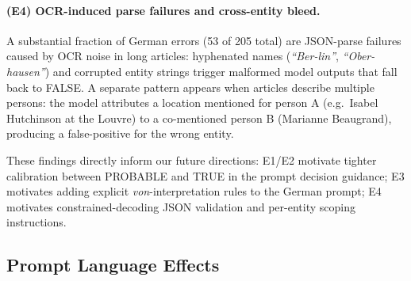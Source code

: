 \documentclass[
]{ceurart}
\theoremstyle{definition}
\begin{document}
\paragraph{(E4) OCR-induced parse failures and cross-entity bleed.}
A substantial fraction of German errors (53 of 205 total) are JSON-parse failures caused by OCR noise in long articles: hyphenated names (\textit{``Ber-lin''}, \textit{``Ober-hausen''}) and corrupted entity strings trigger malformed model outputs that fall back to FALSE.
A separate pattern appears when articles describe multiple persons: the model attributes a location mentioned for person A (e.g.\ Isabel Hutchinson at the Louvre) to a co-mentioned person B (Marianne Beaugrand), producing a false-positive for the wrong entity.

\noindent These findings directly inform our future directions: E1/E2 motivate tighter calibration between PROBABLE and TRUE in the prompt decision guidance; E3 motivates adding explicit \textit{von}-interpretation rules to the German prompt; E4 motivates constrained-decoding JSON validation and per-entity scoping instructions.

\subsection{Prompt Language Effects}
\end{document}
